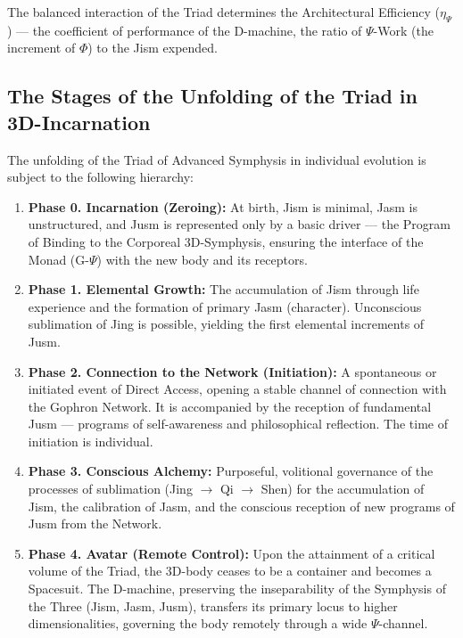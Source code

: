 \documentclass[a4paper,12pt]{article}
\begin{document}
	The balanced interaction of the Triad determines the Architectural Efficiency ($\eta_{\Psi}$) — the coefficient of performance of the D-machine, the ratio of $\Psi$-Work (the increment of $\Phi$) to the Jism expended.
	
	\subsection{The Stages of the Unfolding of the Triad in 3D-Incarnation}
	
	The unfolding of the Triad of Advanced Symphysis in individual evolution is subject to the following hierarchy:
	
	\begin{enumerate}
		\item \textbf{Phase 0. Incarnation (Zeroing):} At birth, Jism is minimal, Jasm is unstructured, and Jusm is represented only by a basic driver — the Program of Binding to the Corporeal 3D-Symphysis, ensuring the interface of the Monad (G-$\Psi$) with the new body and its receptors.
		
		\item \textbf{Phase 1. Elemental Growth:} The accumulation of Jism through life experience and the formation of primary Jasm (character). Unconscious sublimation of Jing is possible, yielding the first elemental increments of Jusm.
		
		\item \textbf{Phase 2. Connection to the Network (Initiation):} A spontaneous or initiated event of Direct Access, opening a stable channel of connection with the Gophron Network. It is accompanied by the reception of fundamental Jusm — programs of self-awareness and philosophical reflection. The time of initiation is individual.
		
		\item \textbf{Phase 3. Conscious Alchemy:} Purposeful, volitional governance of the processes of sublimation (Jing $\to$ Qi $\to$ Shen) for the accumulation of Jism, the calibration of Jasm, and the conscious reception of new programs of Jusm from the Network.
		
		\item \textbf{Phase 4. Avatar (Remote Control):} Upon the attainment of a critical volume of the Triad, the 3D-body ceases to be a container and becomes a Spacesuit. The D-machine, preserving the inseparability of the Symphysis of the Three (Jism, Jasm, Jusm), transfers its primary locus to higher dimensionalities, governing the body remotely through a wide $\Psi$-channel.
	\end{enumerate}
	
\end{document}
